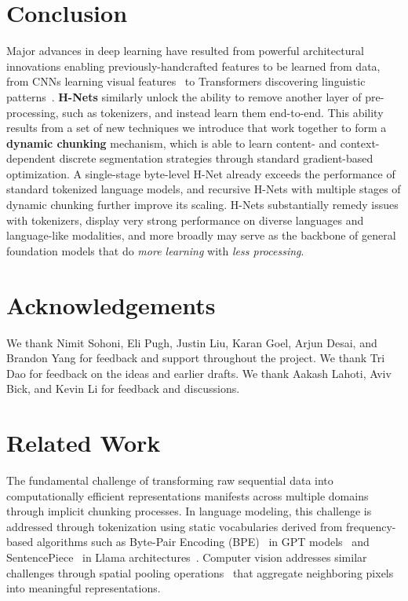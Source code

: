\documentclass{article}
\newcommand{\citep}{\parencite}
\theoremstyle{plain}
\theoremstyle{remark}
\begin{document}
\section{Conclusion}
\label{sec: conclusion}

Major advances in deep learning have resulted from powerful architectural innovations enabling previously-handcrafted features to be learned from data,
from CNNs learning visual features~\citep{AlexNet} to Transformers discovering linguistic patterns~\citep{Transformer}.
\textbf{H-Nets} similarly unlock the ability to remove another layer of pre-processing, such as tokenizers, and instead learn them end-to-end.
This ability results from a set of new techniques we introduce that work together to form a \textbf{dynamic chunking} mechanism,
which is able to learn content- and context- dependent discrete segmentation strategies through standard gradient-based optimization.
A single-stage byte-level H-Net already exceeds the performance of standard tokenized language models,
and recursive H-Nets with multiple stages of dynamic chunking further improve its scaling.
H-Nets substantially remedy issues with tokenizers, display very strong performance on diverse languages and language-like modalities,
and more broadly may serve as the backbone of general foundation models that do \emph{more learning} with \emph{less processing}.

\section*{Acknowledgements}

We thank Nimit Sohoni, Eli Pugh, Justin Liu, Karan Goel, Arjun Desai, and Brandon Yang for feedback and support throughout the project.
We thank Tri Dao for feedback on the ideas and earlier drafts.
We thank Aakash Lahoti, Aviv Bick, and Kevin Li for feedback and discussions.

\clearpage

\printbibliography

\appendix
\onecolumn

\section{Related Work}
\label{sec: background}

The fundamental challenge of transforming raw sequential data into computationally efficient representations manifests across multiple domains through implicit chunking processes.
In language modeling, this challenge is addressed through tokenization using static vocabularies derived from frequency-based algorithms such as Byte-Pair Encoding (BPE)~\citep{BPE} in GPT models~\citep{GPT2, GPT3} and SentencePiece~\citep{SentencePiece} in Llama architectures~\citep{Llama2, Llama3}.
Computer vision addresses similar challenges through spatial pooling operations~\citep{U-Net} that aggregate neighboring pixels into meaningful representations.
\end{document}

